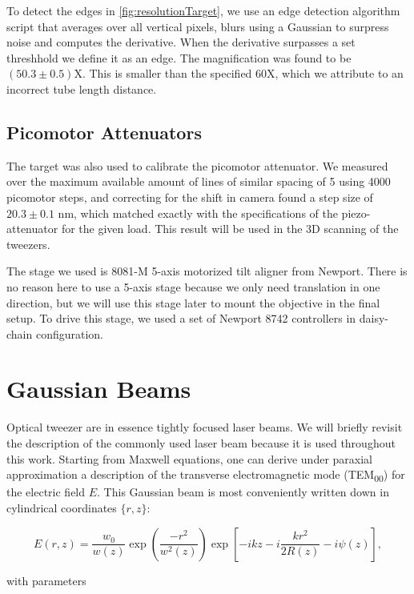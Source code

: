 To detect the edges in \cref{fig:resolutionTarget}, we use an edge detection algorithm script that averages over all vertical pixels, blurs using a Gaussian to surpress noise and computes the derivative. When the derivative surpasses a set threshhold we define it as an edge. The magnification was found to be $(50.3\pm0.5)$X. This is smaller than the specified 60X, which we attribute to an incorrect tube length distance. 

\subsection{Picomotor Attenuators}

The target was also used to calibrate the picomotor attenuator. We measured over the maximum available amount of lines of similar spacing of 5 using 4000 picomotor steps, and correcting for the shift in camera found a step size of $20.3\pm0.1$ nm, which matched exactly with the specifications of the piezo-attenuator for the given load. This result will be used in the 3D scanning of the tweezers. 

The stage we used is 8081-M 5-axis motorized tilt aligner from Newport. There is no reason here to use a 5-axis stage because we only need translation in one direction, but we will use this stage later to mount the objective in the final setup. To drive this stage, we used a set of Newport 8742 controllers in daisy-chain configuration. 


\section{Gaussian Beams}\label{sec:GaussianBeams}

Optical tweezer are in essence tightly focused laser beams. We will briefly revisit the description of the commonly used laser beam because it is used throughout this work. Starting from Maxwell equations, one can derive under paraxial approximation a description of the transverse electromagnetic mode (TEM\textsubscript{00}) \cite{Leeuwen2017} for the electric field $E$. This Gaussian beam is most conveniently written down in cylindrical coordinates $\{r,z\}$:

\begin{equation}\label{GaussianBeam}
	E(r,z) = \frac{w_0}{w(z)} \exp{\left(\frac{-r^2}{w^2(z)}\right)} \exp{\left[-ikz-i\frac{kr^2}{2R(z)} - i\psi(z)\right]},
\end{equation}

with parameters

